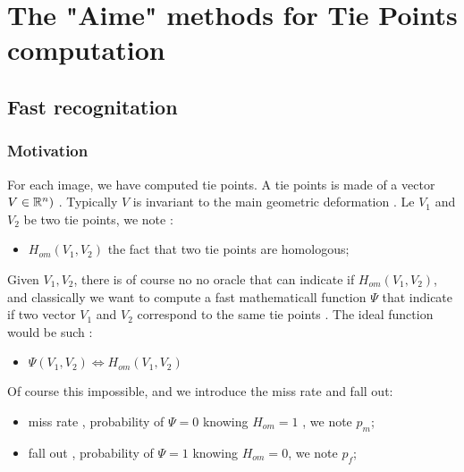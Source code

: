 

\chapter{The "Aime" methods for Tie Points computation}




\section{Fast recognitation}


\subsection{Motivation}
For each image, we have computed tie points. A tie points is made
of a vector $V \in \mathbb{R}^n)$ . Typically $V$ is invariant
to the main geometric deformation .  Le  $V_1$ and $V_2$
be two tie points, we note :

\begin{itemize}
   \item  $H_{om}(V_1,V_2) $ the fact that two tie points are homologous;
\end{itemize}

Given $V_1,V_2$, there is of course no no oracle that can indicate if  $H_{om}(V_1,V_2)$,
and classically we want to compute  a fast mathematicall function $\Psi $ that indicate if two vector $V_1$ and $V_2$
correspond to the same tie points .  The ideal function would be such :

\begin{itemize}
   \item  $\Psi(V_1,V_2)  \iff H_{om}(V_1,V_2)$
\end{itemize}


Of course this impossible, and we introduce the miss rate  and fall out:

\begin{itemize}
   \item   miss rate , probability of $\Psi=0$ knowing $H_{om}=1$ , we note $p_m$;
   \item   fall out , probability of $\Psi=1$ knowing $H_{om}=0$, we note $p_f$;
\end{itemize}

